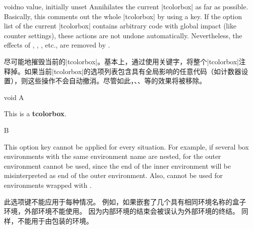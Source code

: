 \begin{docTcbKey}[][doc new=2016-10-21]{void}{}{no value, initially unset}
Annihilates the current |tcolorbox| as far as possible.
Basically, this comments out the whole |tcolorbox| by using a key.
If the option list of the current |tcolorbox| contains arbitrary code with global
impact (like counter settings), these actions are not undone automatically.
Nevertheless, the effects of , ,
, etc., are removed by .

尽可能地摧毁当前的|tcolorbox|。基本上，通过使用关键字，将整个|tcolorbox|注释掉。如果当前|tcolorbox|的选项列表包含具有全局影响的任意代码（如计数器设置），则这些操作不会自动撤消。尽管如此，、、等的效果将被移除。


\begin{exdispExample}{void}
A%
\begin{tcolorbox}[
    title=This box is completely removed by the following key,
    void
]
This is a \textbf{tcolorbox}.
\end{tcolorbox}
B
\end{exdispExample}

\begin{marker}
This option key cannot be applied for every situation.
For example, if several box environments with the same environment name
are nested, for the outer environment  cannot be used,
since the end of the inner environment will be misinterpreted as
end of the outer environment. Also,  cannot be used
for environments wrapped with .

此选项键不能应用于每种情况。%
例如，如果嵌套了几个具有相同环境名称的盒子环境，外部环境不能使用。%
因为内部环境的结束会被误认为外部环境的终结。%
同样，不能用于由包装的环境。
\end{marker}
\end{docTcbKey}




